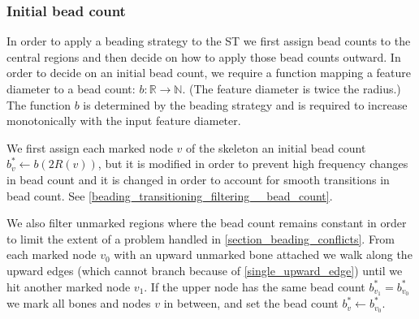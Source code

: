 \subsubsection{Initial bead count}
In order to apply a beading strategy to the ST we first assign bead counts to the central regions and then decide on how to apply those bead counts outward.
In order to decide on an initial bead count, we require a function mapping a feature diameter to a bead count: $b: \mathbb{R} \to \mathbb{N}$.
(The feature diameter is twice the radius.)
The function $b$ is determined by the beading strategy and is required to increase monotonically with the input feature diameter.

We first assign each marked node $v$ of the skeleton an initial bead count $b^*_v \leftarrow b(2R(v))$, but it is modified in order to prevent high frequency changes in bead count and it is changed in order to account for smooth transitions in bead count.
See \cref{beading_transitioning_filtering__bead_count}.

We also filter unmarked regions where the bead count remains constant in order to limit the extent of a problem handled in \cref{section_beading_conflicts}.
From each marked node $v_0$ with an upward unmarked bone attached we walk along the upward edges (which cannot branch because of \cref{single_upward_edge}) until we hit another marked node $v_1$.
If the upper node has the same bead count $b^*_{v_1} = b^*_{v_0}$ we mark all bones and nodes $v$ in between, and set the bead count $b^*_v \leftarrow b^*_{v_0}$.



